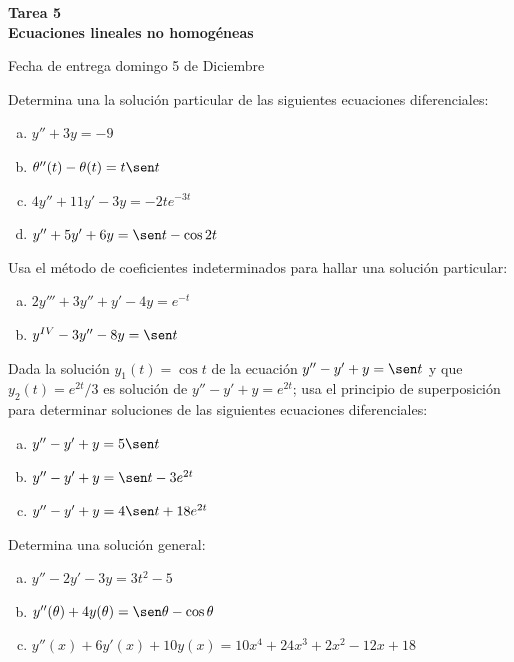 \documentclass[12pt]{exam}
\begin{document}
\centering


\Large 
\textbf{\huge Tarea 5\\ \large Ecuaciones lineales no homogéneas}

\small
Fecha de entrega domingo 5 de Diciembre
\vskip10pt
\normalsize

\pointformat{\bfseries\boldmath(\thepoints)}
\vskip10pt

    
    \begin{questions}
     \question%
     Determina una la solución particular de las siguientes ecuaciones diferenciales:
     \begin{enumerate}[a)]
         \item $y''+3y=-9$
         \item $\theta''(t)-\theta(t)=t\sen t$
         \item $4y''+11y'-3y=-2te^{-3t}$
         \item $y''+5y'+6y=\sen t-\cos 2t$
     \end{enumerate}


     \question%
     Usa el método de coeficientes indeterminados para hallar una solución particular:
     \begin{enumerate}[a)]
     	\item	$2y'''+3y''+y'-4y=e^{-t}$
        \item	$y^{IV}-3y''-8y=\sen t$
     \end{enumerate}

     
     \question%
     Dada la solución $y_1(t)=\cos t$ de la ecuación $y''-y'+y=\sen t$ y que $y_2(t)=e^{2t}/3$ es solución de $y''-y'+y=e^{2t}$; usa el principio de superposición para determinar soluciones de las siguientes ecuaciones diferenciales:
     \begin{enumerate}[a)]
     	\item	$y''-y'+y=5\sen t$
        \item	$y''-y'+y= \sen t-3e^{2t}$
        \item	$y''-y'+y=4\sen t+18e^{2t}$
     \end{enumerate}


     \question%
     Determina una solución general:
     \begin{enumerate}[a)]
     	\item	$y''-2y'-3y=3t^2-5$
        \item	$y''(\theta)+4y(\theta)=\sen\theta-\cos\theta$
        \item	$y''(x)+6y'(x)+10y(x)=10x^4+24x^3+2x^2-12x+18$
     \end{enumerate}




\end{questions}
\end{document}
